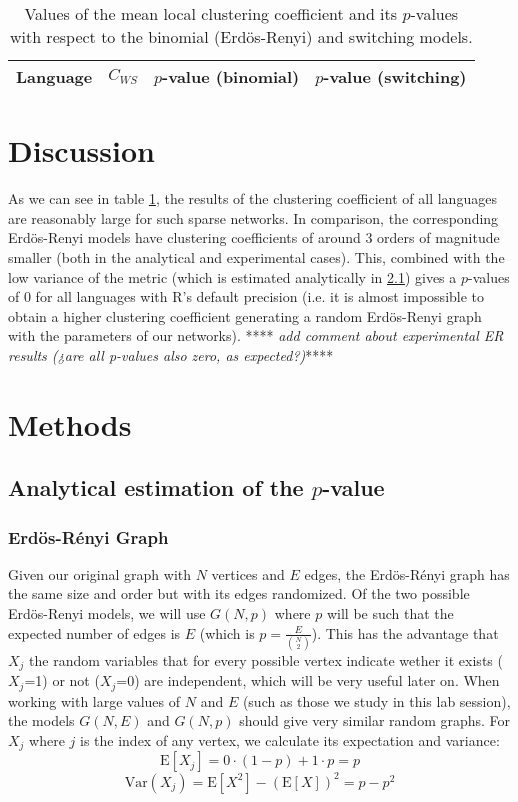 \documentclass[paper=a4, fontsize=11pt]{scrartcl} %
\newcommand{\E}{\mathrm{E}}
\newcommand{\Var}{\mathrm{Var}}
\begin{document}
\begin{table}
\centering
\caption{Values of the mean local clustering coefficient and its $p$-values with respect to the binomial (Erdös-Renyi) and switching models.}
\label{table2}
\begin{tabular}{l|lll}
Language		& $C_{WS}$		& $p$-value (binomial) 	& $p$-value (switching) \\ \hline

\end{tabular}
\end{table}



\section{Discussion}
As we can see in table \ref{table2}, the results of the clustering coefficient of all languages are reasonably large for such sparse networks. In comparison, the corresponding Erdös-Renyi models have clustering coefficients of around 3 orders of magnitude smaller (both in the analytical and experimental cases). This, combined with the low variance of the metric (which is estimated analytically in \ref{analytical}) gives a $p$-values of 0 for all languages with R's default precision (i.e. it is almost impossible to obtain a higher clustering coefficient generating a random Erdös-Renyi graph with the parameters of our networks).  ****\textit{ add comment about experimental ER results (¿are all p-values also zero, as expected?)}****






\section{Methods}

\subsection{Analytical estimation of the $p$-value} \label{analytical}
\subsubsection{Erdös-Rényi Graph}
Given our original graph with $N$ vertices and $E$ edges, the Erdös-Rényi graph has the same size and order but with its edges randomized.  Of the two possible Erdös-Renyi models, we will use $G(N,p)$ where $p$ will be such that the expected number of edges is $E$ (which is $p=\frac{E}{\binom{N}{2}}$). This has the advantage that $X_j$ the random variables that for every possible vertex indicate wether it exists ($X_j$=1) or not ($X_j$=0) are independent, which will be very useful later on. When working with large values of $N$ and $E$ (such as those we study in this lab session), the models $G(N,E)$ and $G(N,p)$ should give very similar random graphs. 
For $X_j$ where $j$ is the index of any vertex, we calculate its expectation and variance: 
$$\E[X_j]=0\cdot(1-p)+1\cdot p=p$$
$$\Var(X_j)=\E[X^2]-(\E[X])^2=p-p^2$$
\end{document}
